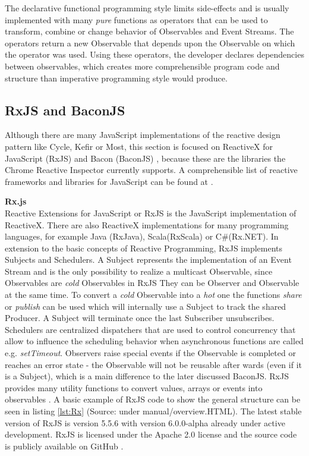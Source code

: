 	The declarative functional programming style limits side-effects and is usually implemented with many \emph{pure} functions as operators that can be used to transform, combine or change behavior of Observables and Event Streams. The operators return a new Observable that depends upon the Observable on which the operator was used. Using these operators, the developer declares dependencies between observables, which creates more comprehensible program code and structure \cite[Why Reactive Programming?]{ReactiveInspector} than imperative programming style would produce. 	

	\subsection{RxJS and BaconJS}
	Although there are many JavaScript implementations of the reactive design pattern like Cycle\cite{CycleJS}, Kefir\cite{KefirJS} or  Most\cite{MostJS}, this section is focused on ReactiveX for JavaScript (RxJS) \cite{RxJS} and Bacon (BaconJS) \cite{BaconJS}, because these are the libraries the Chrome Reactive Inspector currently supports. A comprehensible list of reactive frameworks and libraries for JavaScript can be found at \cite{FRPJSList}.
	
	\textbf{Rx.js}\\
	Reactive Extensions for JavaScript or RxJS is the JavaScript implementation of ReactiveX. There are also ReactiveX implementations for many programming languages, for example Java (RxJava), Scala(RxScala) or C\#(Rx.NET). In extension to the basic concepts of Reactive Programming, RxJS implements Subjects and Schedulers. A Subject represents the implementation of an Event Stream and is the only possibility to realize a multicast Observable, since Observables are \emph{cold} Observables in RxJS They can be Observer and Observable at the same time. To convert a \emph{cold} Observable into a \emph{hot} one the functions \emph{share} or \emph{publish} can be used which will internally use a Subject to track the shared Producer. A Subject will terminate once the last Subscriber unsubscribes. Schedulers are centralized dispatchers that are used to control concurrency that allow to influence the scheduling behavior when asynchronous functions are called e.g. \emph{setTimeout}\cite{RxJsDocu}.
	Observers raise special events if the Observable is completed or reaches an error state - the Observable will not be reusable after wards (even if it is a Subject), which is a main difference to the later discussed BaconJS. RxJS provides many utility functions to convert values, arrays or events into observables \cite{ThesisBaradur}. A basic example of RxJS code to show the general structure can be seen in listing \ref{lst:Rx} (Source: \cite{RxJsDocu} under manual/overview.HTML).
	The latest stable version of RxJS is version 5.5.6 with version 6.0.0-alpha already under active development. RxJS is licensed under the Apache 2.0 license and the source code is publicly available on GitHub \cite{RxJS}.

